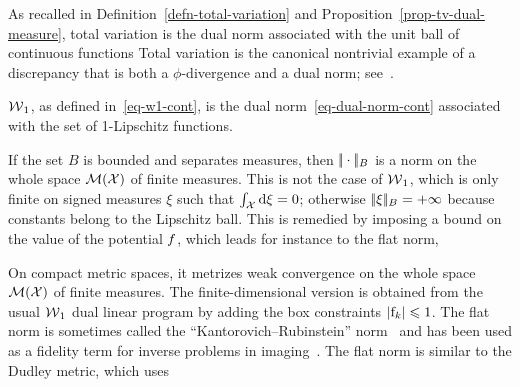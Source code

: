 \begin{example}
As recalled in Definition~\ref{defn-total-variation} and Proposition~\ref{prop-tv-dual-measure}, total variation is the dual norm associated with the unit ball of continuous functions
Total variation is the canonical nontrivial example of a discrepancy that is both a $\phi$-divergence and a dual norm; see~\cite{sriperumbudur2009integral}.
\end{example}

\begin{example}
$\operatorname{\mathcal{W}}_1$, as defined in~\eqref{eq-w1-cont}, is the dual norm~\eqref{eq-dual-norm-cont} associated with
the set of 1-Lipschitz functions.
\end{example}

\begin{example}
If the set $B$ is bounded and separates measures, then $|\!| \cdot |\!|_B$ is a norm on the whole space $\mathcal{M}(\mathcal{X})$ of finite measures.
%
	This is not the case of $\operatorname{\mathcal{W}}_1$, which is only finite on signed measures $\xi$ such that $\int_{\mathcal{X}} \mathrm{d}\xi=0$; otherwise $|\!| \xi |\!|_B=+\infty$ because constants belong to the Lipschitz ball.
%
This is remedied by imposing a bound on the value of the potential $f$, which leads for instance to the flat norm,

On compact metric spaces, it metrizes weak convergence on the whole space $\mathcal{M}(\mathcal{X})$ of finite measures.
%
The finite-dimensional version is obtained from the usual $\operatorname{\mathcal{W}}_1$ dual linear program by adding the box constraints $\left\lvert\mathrm{f}_k\right\rvert\leqslant1$.
%
The flat norm is sometimes called the ``Kantorovich--Rubinstein'' norm~\cite{hanin1992kantorovich} and has been used as a fidelity term for inverse problems in imaging~\cite{lellmann2014imaging}.
%
The flat norm is similar to the Dudley metric, which uses
\end{example}

